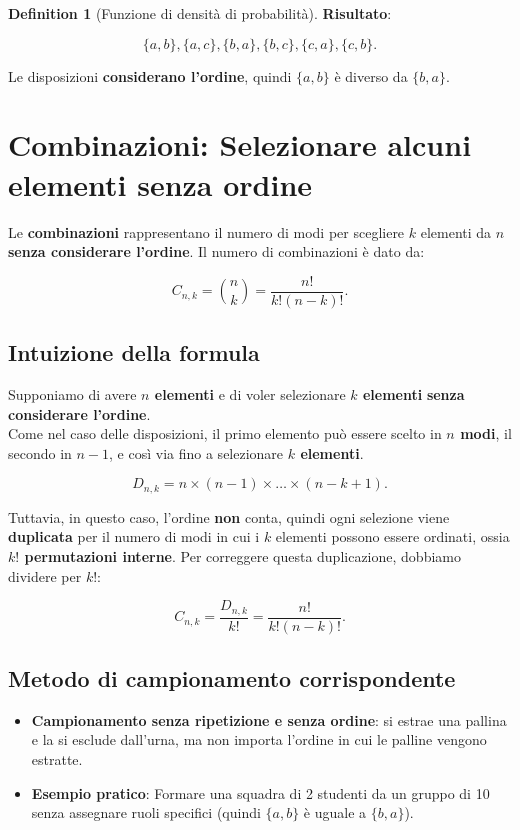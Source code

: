 \documentclass[
  letterpaper,
  DIV=11,
  numbers=noendperiod,
  oneside]{scrreprt}
\providecommand{\tightlist}{%
  \setlength{\itemsep}{0pt}\setlength{\parskip}{0pt}}
\theoremstyle{definition}
\theoremstyle{plain}
\theoremstyle{definition}
\newtheorem{definition}{Definition}[chapter]
\theoremstyle{remark}
\begin{document}
\begin{definition}[Funzione di densità di
probabilità]
\textbf{Risultato}:

\[
\{a, b\}, \{a, c\}, \{b, a\}, \{b, c\}, \{c, a\}, \{c, b\}.
\]

Le disposizioni \textbf{considerano l'ordine}, quindi \(\{a, b\}\) è
diverso da \(\{b, a\}\).

\section{Combinazioni: Selezionare alcuni elementi senza
ordine}\label{combinazioni-selezionare-alcuni-elementi-senza-ordine}

Le \textbf{combinazioni} rappresentano il numero di modi per scegliere
\(k\) elementi da \(n\) \textbf{senza considerare l'ordine}. Il numero
di combinazioni è dato da:

\[
C_{n,k} = \binom{n}{k} = \frac{n!}{k!(n-k)!} .
\]

\subsection{Intuizione della formula}\label{intuizione-della-formula-2}

Supponiamo di avere \textbf{\(n\) elementi} e di voler selezionare
\textbf{\(k\) elementi} \textbf{senza considerare l'ordine}.\\
Come nel caso delle disposizioni, il primo elemento può essere scelto in
\textbf{\(n\) modi}, il secondo in \textbf{\(n-1\)}, e così via fino a
selezionare \textbf{\(k\) elementi}.

\[
D_{n,k} = n \times (n-1) \times \dots \times (n-k+1) .
\]

Tuttavia, in questo caso, l'ordine \textbf{non} conta, quindi ogni
selezione viene \textbf{duplicata} per il numero di modi in cui i \(k\)
elementi possono essere ordinati, ossia \textbf{\(k!\) permutazioni
interne}. Per correggere questa duplicazione, dobbiamo dividere per
\(k!\):

\[
C_{n,k} = \frac{D_{n,k}}{k!} = \frac{n!}{k!(n-k)!} .
\]

\subsection{Metodo di campionamento
corrispondente}\label{metodo-di-campionamento-corrispondente-2}

\begin{itemize}
\tightlist
\item
  \textbf{Campionamento senza ripetizione e senza ordine}: si estrae una
  pallina e la si esclude dall'urna, ma non importa l'ordine in cui le
  palline vengono estratte.\\
\item
  \textbf{Esempio pratico}: Formare una squadra di 2 studenti da un
  gruppo di 10 senza assegnare ruoli specifici (quindi \(\{a, b\}\) è
  uguale a \(\{b, a\}\)).
\end{itemize}


\end{definition}
\end{document}
